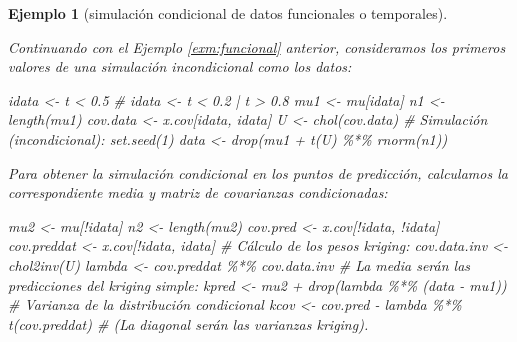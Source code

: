 \documentclass[
]{book}
\newenvironment{Shaded}{\begin{snugshade}}{\end{snugshade}}
\newcommand{\CommentTok}[1]{\textcolor[rgb]{0.56,0.35,0.01}{\textit{#1}}}
\newcommand{\DecValTok}[1]{\textcolor[rgb]{0.00,0.00,0.81}{#1}}
\newcommand{\FloatTok}[1]{\textcolor[rgb]{0.00,0.00,0.81}{#1}}
\newcommand{\FunctionTok}[1]{\textcolor[rgb]{0.00,0.00,0.00}{#1}}
\newcommand{\NormalTok}[1]{#1}
\newcommand{\OtherTok}[1]{\textcolor[rgb]{0.56,0.35,0.01}{#1}}
\newcommand{\SpecialCharTok}[1]{\textcolor[rgb]{0.00,0.00,0.00}{#1}}
\theoremstyle{break}
\newtheorem{example}{Ejemplo}[chapter]
\theoremstyle{nonumberplain}
\begin{document}
\begin{example}[simulación condicional de datos funcionales o temporales]
\protect\hypertarget{exm:funcionalcond}{}\label{exm:funcionalcond}

Continuando con el Ejemplo \ref{exm:funcional} anterior, consideramos los primeros
valores de una simulación incondicional como los datos:

\begin{Shaded}
\begin{Highlighting}[]
\NormalTok{idata }\OtherTok{\textless{}{-}}\NormalTok{ t }\SpecialCharTok{\textless{}} \FloatTok{0.5}
\CommentTok{\# idata \textless{}{-} t \textless{} 0.2 | t \textgreater{} 0.8}
\NormalTok{mu1 }\OtherTok{\textless{}{-}}\NormalTok{ mu[idata]}
\NormalTok{n1 }\OtherTok{\textless{}{-}} \FunctionTok{length}\NormalTok{(mu1)}
\NormalTok{cov.data }\OtherTok{\textless{}{-}}\NormalTok{ x.cov[idata, idata]}
\NormalTok{U }\OtherTok{\textless{}{-}} \FunctionTok{chol}\NormalTok{(cov.data)}
\CommentTok{\# Simulación (incondicional):}
\FunctionTok{set.seed}\NormalTok{(}\DecValTok{1}\NormalTok{)}
\NormalTok{data }\OtherTok{\textless{}{-}} \FunctionTok{drop}\NormalTok{(mu1 }\SpecialCharTok{+} \FunctionTok{t}\NormalTok{(U) }\SpecialCharTok{\%*\%} \FunctionTok{rnorm}\NormalTok{(n1))}
\end{Highlighting}
\end{Shaded}

Para obtener la simulación condicional en los puntos de predicción, calculamos la correspondiente media y matriz de covarianzas condicionadas:

\begin{Shaded}
\begin{Highlighting}[]
\NormalTok{mu2 }\OtherTok{\textless{}{-}}\NormalTok{ mu[}\SpecialCharTok{!}\NormalTok{idata]}
\NormalTok{n2 }\OtherTok{\textless{}{-}} \FunctionTok{length}\NormalTok{(mu2)}
\NormalTok{cov.pred }\OtherTok{\textless{}{-}}\NormalTok{ x.cov[}\SpecialCharTok{!}\NormalTok{idata, }\SpecialCharTok{!}\NormalTok{idata]}
\NormalTok{cov.preddat }\OtherTok{\textless{}{-}}\NormalTok{ x.cov[}\SpecialCharTok{!}\NormalTok{idata, idata]}
\CommentTok{\# Cálculo de los pesos kriging:}
\NormalTok{cov.data.inv }\OtherTok{\textless{}{-}} \FunctionTok{chol2inv}\NormalTok{(U)}
\NormalTok{lambda }\OtherTok{\textless{}{-}}\NormalTok{ cov.preddat }\SpecialCharTok{\%*\%}\NormalTok{ cov.data.inv}
\CommentTok{\# La media serán las predicciones del kriging simple:}
\NormalTok{kpred }\OtherTok{\textless{}{-}}\NormalTok{ mu2 }\SpecialCharTok{+} \FunctionTok{drop}\NormalTok{(lambda }\SpecialCharTok{\%*\%}\NormalTok{ (data }\SpecialCharTok{{-}}\NormalTok{ mu1))}
\CommentTok{\# Varianza de la distribución condicional}
\NormalTok{kcov }\OtherTok{\textless{}{-}}\NormalTok{ cov.pred }\SpecialCharTok{{-}}\NormalTok{  lambda }\SpecialCharTok{\%*\%} \FunctionTok{t}\NormalTok{(cov.preddat)}
\CommentTok{\# (La diagonal serán las varianzas kriging). }
\end{Highlighting}
\end{Shaded}


\end{example}
\end{document}
